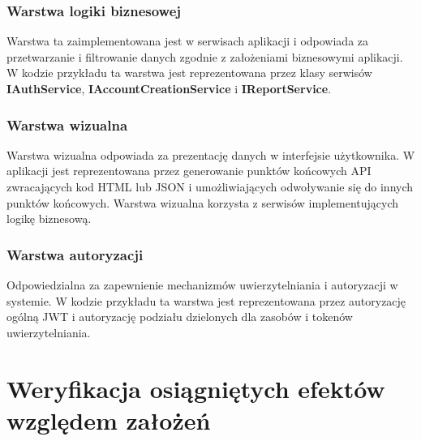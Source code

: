 \documentclass[12pt,a4paper,oneside]{article}
\begin{document}
\subsubsection{Warstwa logiki biznesowej}
Warstwa ta zaimplementowana jest w serwisach aplikacji i odpowiada za
przetwarzanie i filtrowanie danych zgodnie z założeniami biznesowymi aplikacji.
W kodzie przykładu ta warstwa jest reprezentowana przez klasy serwisów
\textbf{IAuthService}, \textbf{IAccountCreationService} i \textbf{IReportService}.

\subsubsection{Warstwa wizualna}
Warstwa wizualna odpowiada za prezentację danych w interfejsie użytkownika. 
W aplikacji jest reprezentowana przez generowanie punktów końcowych 
API zwracających kod HTML lub JSON i umożliwiających odwoływanie się do innych 
punktów końcowych. Warstwa wizualna korzysta z serwisów implementujących logikę 
biznesową.

\subsubsection{Warstwa autoryzacji}
Odpowiedzialna za zapewnienie mechanizmów uwierzytelniania i autoryzacji w 
systemie. W kodzie przykładu ta warstwa jest reprezentowana przez autoryzację 
ogólną JWT i autoryzację podziału dzielonych dla zasobów i tokenów 
uwierzytelniania.


\section{Weryfikacja osiągniętych efektów względem założeń}
\end{document}
